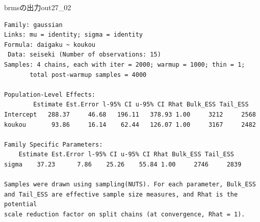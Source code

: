 \begin{Rscreen}{brmsの出力}{out27_02}
	\begin{verbatim}
Family: gaussian 
Links: mu = identity; sigma = identity 
Formula: daigaku ~ koukou 
 Data: seiseki (Number of observations: 15) 
Samples: 4 chains, each with iter = 2000; warmup = 1000; thin = 1;
       total post-warmup samples = 4000

Population-Level Effects: 
        Estimate Est.Error l-95% CI u-95% CI Rhat Bulk_ESS Tail_ESS
Intercept   288.37     46.68   196.11   378.93 1.00     3212     2568
koukou       93.86     16.14    62.44   126.07 1.00     3167     2482

Family Specific Parameters: 
    Estimate Est.Error l-95% CI u-95% CI Rhat Bulk_ESS Tail_ESS
sigma    37.23      7.86    25.26    55.84 1.00     2746     2839

Samples were drawn using sampling(NUTS). For each parameter, Bulk_ESS
and Tail_ESS are effective sample size measures, and Rhat is the potential
scale reduction factor on split chains (at convergence, Rhat = 1).
\end{verbatim}
\end{Rscreen}
